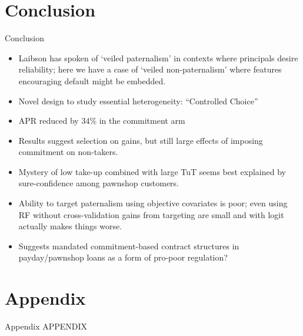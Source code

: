 \documentclass[8pt]{beamer}
\begin{document}
\section{Conclusion}
\begin{frame}{Conclusion}
    \begin{itemize}
     \vfill \item Laibson has spoken of `veiled paternalism' in contexts where principals desire reliability; here we have a case of `veiled non-paternalism' where features encouraging default might be embedded.
     \vfill \item Novel design to study essential heterogeneity: ``Controlled Choice''
        \vfill \item  APR reduced by 34\% in the commitment arm
        \vfill  \item Results suggest selection on gains, but still large effects of imposing commitment on non-takers.
        \vfill \item Mystery of low take-up combined with large TuT seems best explained by sure-confidence among pawnshop customers.
        \vfill\item  Ability to target paternalism using objective covariates is poor; even using RF without cross-validation gains from targeting are small and with logit actually makes things worse.
        \vfill \item Suggests mandated commitment-based contract structures in payday/pawnshop loans as a form of pro-poor regulation?
    \end{itemize}  
\end{frame}

\appendix



\section{Appendix}


\begin{frame}{Appendix}
\vfill \centering APPENDIX
\end{frame}
\end{document}
